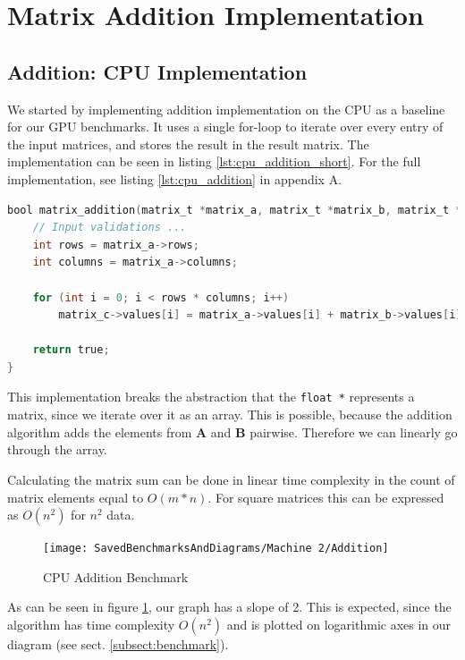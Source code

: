 \section{Matrix Addition Implementation}

\subsection{Addition: CPU Implementation}

We started by implementing addition implementation on the CPU as a baseline for our GPU benchmarks. It uses a single for-loop to iterate over every entry of the input matrices, and stores the result in the result matrix. The implementation can be seen in listing \ref{lst:cpu_addition_short}. For the full implementation, see listing \ref{lst:cpu_addition} in appendix A. 


\begin{lstlisting}[language=C, caption={CPU addition algorithm}, label={lst:cpu_addition_short}]
bool matrix_addition(matrix_t *matrix_a, matrix_t *matrix_b, matrix_t *matrix_c) {
    // Input validations ...
    int rows = matrix_a->rows;
    int columns = matrix_a->columns;

    for (int i = 0; i < rows * columns; i++)
        matrix_c->values[i] = matrix_a->values[i] + matrix_b->values[i];

    return true;
}
\end{lstlisting}

This implementation breaks the abstraction that the \texttt{float *} represents a matrix, since we iterate over it as an array. This is possible, because the addition algorithm adds the elements from $\mathbf{A}$ and $\mathbf{B}$ pairwise. Therefore we can linearly go through the array.

Calculating the matrix sum can be done in linear time complexity in the count of matrix elements equal to $O(m * n)$. For square matrices this can be expressed as $O(n^2)$ for $n^2$ data. 

\begin{figure}
    \centering
    \texttt{[image: SavedBenchmarksAndDiagrams/Machine 2/Addition]}
    \caption{CPU Addition Benchmark}
    \label{fig:addition_cpu_bench}
\end{figure}

 As can be seen in figure \ref{fig:addition_cpu_bench}, our graph has a slope of 2. This is expected, since the algorithm has time complexity $O(n^2)$ and is plotted on logarithmic axes in our diagram (see sect. \ref{subsect:benchmark}).

